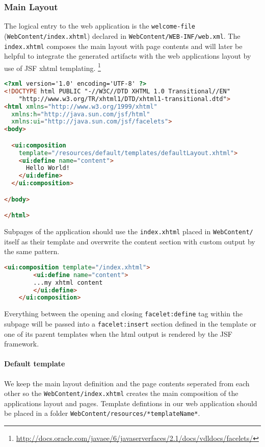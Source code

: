 \subsubsection{Main Layout}
\label{subsec:referenceMainLayout} 

The logical entry to the web application is the \texttt{welcome-file}
(\texttt{WebContent/index.xhtml}) declared in
\texttt{WebContent/WEB-INF/web.xml}. The \texttt{index.xhtml} composes the
main layout with page contents and will later be helpful to integrate the
generated artifacts with the web applications layout by use of JSF xhtml templating.
\footnote{\url{http://docs.oracle.com/javaee/6/javaserverfaces/2.1/docs/vdldocs/facelets/}}

\begin{lstlisting}[language=HTML]
<?xml version='1.0' encoding='UTF-8' ?>
<!DOCTYPE html PUBLIC "-//W3C//DTD XHTML 1.0 Transitional//EN" 
    "http://www.w3.org/TR/xhtml1/DTD/xhtml1-transitional.dtd">
<html xmlns="http://www.w3.org/1999/xhtml"
  xmlns:h="http://java.sun.com/jsf/html"
  xmlns:ui="http://java.sun.com/jsf/facelets">
<body>

  <ui:composition
    template="/resources/default/templates/defaultLayout.xhtml">
    <ui:define name="content">
      Hello World!
    </ui:define>
  </ui:composition>

</body>

</html>
\end{lstlisting}
 
Subpages of the application should use the \texttt{index.xhtml} placed in
\texttt{WebContent/} itself as their template and overwrite the content section
with custom output by the same pattern.

\begin{lstlisting}[language=HTML] 
	<ui:composition template="/index.xhtml">
  		<ui:define name="content">
  		...my xhtml content
  		</ui:define>
 	</ui:composition>
\end{lstlisting}

Everything between the opening and closing \texttt{facelet:define} tag within
the subpage will be passed into a \texttt{facelet:insert} section defined in the
template or one of its parent templates when the html output is rendered by the
JSF framework.

\paragraph{Default template}
$\;$ \\
We keep the main layout definition and the page contents seperated from each
other so the \texttt{WebContent/index.xhtml} creates the main composition of the
applications layout and pages. Template defintions in our web application should
be placed in a folder \newline \texttt{WebContent/resources/*templateName*}.

